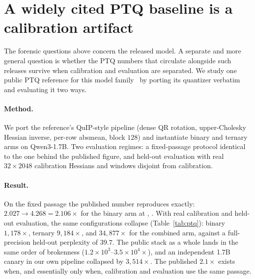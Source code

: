 \section{A widely cited PTQ baseline is a calibration artifact}
\label{sec:ptq}

The forensic questions above concern the released model. A separate and more
general question is whether the PTQ numbers that circulate alongside such
releases survive when calibration and evaluation are separated. We study one
public PTQ reference for this model family~\citep{thaki} by porting its
quantizer verbatim and evaluating it two ways.

\paragraph{Method.}
We port the reference's QuIP-style pipeline (dense QR rotation, upper-Cholesky
Hessian inverse, per-row absmean, block $128$) and instantiate binary and
ternary arms on Qwen3-1.7B. Two evaluation regimes: a fixed-passage protocol
identical to the one behind the published figure, and held-out evaluation with
real $32\times2048$ calibration Hessians and windows disjoint from calibration.

\paragraph{Result.}
On the fixed passage the published number reproduces exactly: $2.027
\rightarrow 4.268 = 2.106\times$ for the binary arm at ,
. With real calibration and held-out evaluation, the same
configurations collapse (Table~\ref{tab:ptq}): binary $1{,}178\times$, ternary
$9{,}184\times$, and $34{,}877\times$ for the combined arm, against a
full-precision held-out perplexity of $39.7$. The public stack as a whole lands
in the same order of brokenness ($1.2\times10^{3}$--$3.5\times10^{4}\times$),
and an independent 1.7B canary in our own pipeline collapsed by
$3{,}514\times$. The published $2.1\times$ exists when, and essentially only
when, calibration and evaluation use the same passage.

